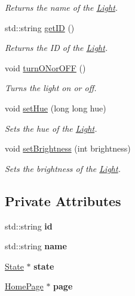 \begin{DoxyCompactItemize}
\begin{DoxyCompactList}\small\item\em Returns the name of the \hyperlink{class_light}{Light}. \end{DoxyCompactList}\item 
std\+::string \hyperlink{class_light_a7a41305231132e8bae6a899b703fd39a}{get\+ID} ()
\begin{DoxyCompactList}\small\item\em Returns the ID of the \hyperlink{class_light}{Light}. \end{DoxyCompactList}\item 
void \hyperlink{class_light_ab22e6d81d0ccb2f844d404e2e038f9a2}{turn\+O\+Nor\+O\+FF} ()
\begin{DoxyCompactList}\small\item\em Turns the light on or off. \end{DoxyCompactList}\item 
void \hyperlink{class_light_addc99af8c89bfd9c0ebd8908bd290ba7}{set\+Hue} (long long hue)
\begin{DoxyCompactList}\small\item\em Sets the hue of the \hyperlink{class_light}{Light}. \end{DoxyCompactList}\item 
void \hyperlink{class_light_a95d42b02b50ea8f060be6efa0481ba3c}{set\+Brightness} (int brightness)
\begin{DoxyCompactList}\small\item\em Sets the brightness of the \hyperlink{class_light}{Light}. \end{DoxyCompactList}\end{DoxyCompactItemize}
\subsection*{Private Attributes}
\begin{DoxyCompactItemize}
\item 
\mbox{\label{class_light_a3aede2c7bf6a2e7596e3b93735470b6d}} 
std\+::string {\bfseries id}
\item 
\mbox{\label{class_light_aed2e518d1e739c50c31ae77a865f51ed}} 
std\+::string {\bfseries name}
\item 
\mbox{\label{class_light_a6f17ea47d17e0536c67cd13e230953ad}} 
\hyperlink{class_state}{State} $\ast$ {\bfseries state}
\item 
\mbox{\label{class_light_a0cc3c685f7ee10e6c2925d8ba660ce61}} 
\hyperlink{class_home_page}{Home\+Page} $\ast$ {\bfseries page}
\end{DoxyCompactItemize}


